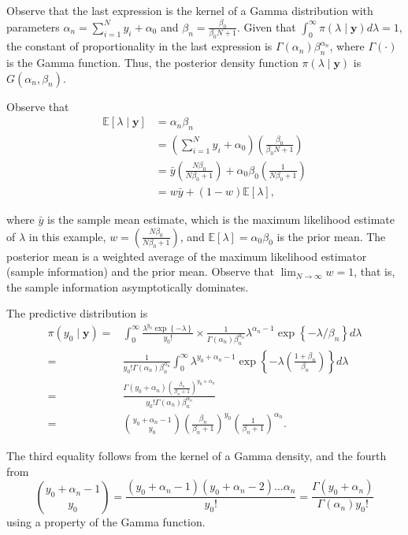 Observe that the last expression is the kernel of a Gamma distribution with parameters \( \alpha_n = \sum_{i=1}^N y_i + \alpha_0 \) and \( \beta_n = \frac{\beta_0}{\beta_0 N + 1} \). Given that \( \int_0^{\infty} \pi(\lambda \mid \mathbf{y}) d\lambda = 1 \), the constant of proportionality in the last expression is \( \Gamma(\alpha_n) \beta_n^{\alpha_n} \), where \( \Gamma(\cdot) \) is the Gamma function. Thus, the posterior density function \( \pi(\lambda \mid \mathbf{y}) \) is \( G(\alpha_n, \beta_n) \).

Observe that 
\begin{align*}
	\mathbb{E}[\lambda\mid \mathbf{y}]&=\alpha_n\beta_n\\
	&=\left(\sum_{i=1}^N y_i + \alpha_0\right)\left(\frac{\beta_0}{\beta_0 N + 1}\right)\\
	&=\bar{y}\left(\frac{N\beta_0}{N\beta_0+1}\right)+\alpha_0\beta_0\left(\frac{1}{N\beta_0+1}\right)\\
	&=w\bar{y}+(1-w)\mathbb{E}[\lambda],
\end{align*}

where \( \bar{y} \) is the sample mean estimate, which is the maximum likelihood estimate of \( \lambda \) in this example, \( w = \left(\frac{N\beta_0}{N\beta_0 + 1}\right) \), and \( \mathbb{E}[\lambda] = \alpha_0 \beta_0 \) is the prior mean. The posterior mean is a weighted average of the maximum likelihood estimator (sample information) and the prior mean. Observe that \( \lim_{N \to \infty} w = 1 \), that is, the sample information asymptotically dominates.

The predictive distribution is
\begin{align*}
	\pi(y_0\mid \mathbf{y})=&\int_{0}^{\infty}\frac{\lambda^{y_0}\exp\left\{-\lambda\right\}}{y_0!}\times \frac{1}{\Gamma(\alpha_n)\beta_n^{\alpha_n}}\lambda^{\alpha_n-1}\exp\left\{-\lambda/\beta_n\right\} d\lambda\\
	=&\frac{1}{y_0!\Gamma(\alpha_n)\beta_n^{\alpha_n}}\int_{0}^{\infty}\lambda^{y_0+\alpha_n-1}\exp\left\{-\lambda\left(\frac{1+\beta_n}{\beta_n}\right)\right\}d\lambda\\
	=&\frac{\Gamma(y_0+\alpha_n)\left(\frac{\beta_n}{\beta_n+1}\right)^{y_0+\alpha_n}}{y_0!\Gamma(\alpha_n)\beta_n^{\alpha_n}}\\
	=&{y_0+\alpha_n-1 \choose y_0}\left(\frac{\beta_n}{\beta_n+1}\right)^{y_0}\left(\frac{1}{\beta_n+1}\right)^{\alpha_n}.
\end{align*}

The third equality follows from the kernel of a Gamma density, and the fourth from 
\[
{y_0 + \alpha_n - 1 \choose y_0} = \frac{(y_0 + \alpha_n - 1)(y_0 + \alpha_n - 2)\dots\alpha_n}{y_0!} = \frac{\Gamma(y_0 + \alpha_n)}{\Gamma(\alpha_n) y_0!}
\]
using a property of the Gamma function.

